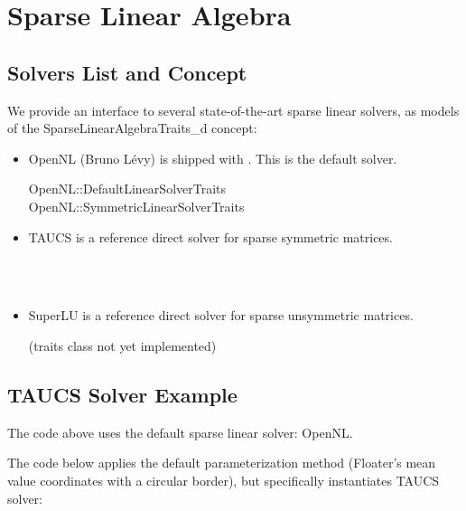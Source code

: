 \section{Sparse Linear Algebra}

\subsection{Solvers List and Concept}

We provide an interface to several state-of-the-art
sparse linear solvers, as models of the SparseLinearAlgebraTraits\_d concept:

\begin{itemize}

\item OpenNL (Bruno L{\'e}vy) is shipped with \cgal. This is the default solver.

OpenNL::DefaultLinearSolverTraits  \\
OpenNL::SymmetricLinearSolverTraits  \\

\item TAUCS is a reference direct solver for sparse symmetric matrices.

  \\
  \\

\item SuperLU is a reference direct solver for sparse unsymmetric matrices.

(traits class not yet implemented)

\end{itemize}


\subsection{TAUCS Solver Example}

The code above uses the default sparse linear solver: OpenNL.

The code below applies the default parameterization method
(Floater's mean value coordinates with a circular border),
but specifically instantiates TAUCS solver:

